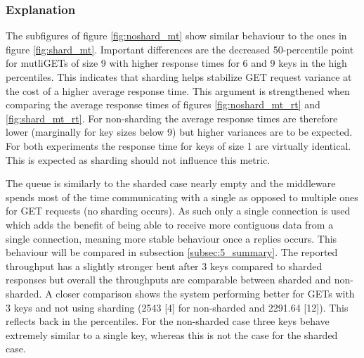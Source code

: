         \subsubsection{Explanation\label{subsubsec:5_nonsharded_summary}}

            The subfigures of figure \ref{fig:noshard_mt} show similar behaviour to the ones in figure
            \ref{fig:shard_mt}.  Important differences are the decreased 50-percentile point for mutliGETs of size 9
            with higher response times for 6 and 9 keys in the high percentiles. This indicates that sharding helps
            stabilize GET request variance at the cost of a higher average response time. This argument is strengthened
            when comparing the average response times of figures \ref{fig:noshard_mt_rt} and \ref{fig:shard_mt_rt}. For
            non-sharding the average response times are therefore lower (marginally for key sizes below 9) but higher
            variances are to be expected. For both experiments the response time for keys of size 1 are virtually
            identical. This is expected as sharding should not influence this metric.


            The queue is similarly to the sharded case nearly empty and the middleware spends most of the time
            communicating with a single \srv{} as opposed to multiple ones for GET requests (no sharding occurs). As
            such only a single connection is used which adds the benefit of being able to receive more contiguous data
            from a single connection, meaning more stable behaviour once a replies occurs. This behaviour will be
            compared in subsection \ref{subsec:5_summary}.\newline
            The reported throughput has a slightly stronger bent after 3 keys compared to sharded responses but overall
            the throughputs are comparable between sharded and non-sharded. A closer comparison shows the system
            performing better for GETs with 3 keys and not using sharding (2543 [4] for non-sharded and 2291.64 [12]).
            This reflects back in the percentiles. For the non-sharded case three keys behave extremely similar to a
            single key, whereas this is not the case for the sharded case.

